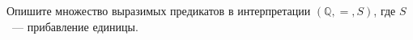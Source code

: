 Опишите множество выразимых предикатов в интерпретации $(\mathbb{Q}, =, S)$, где $S$~--- прибавление
единицы.